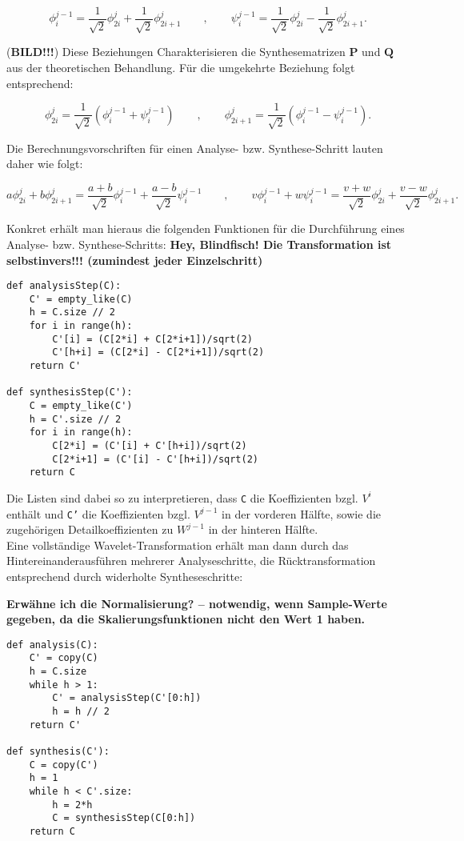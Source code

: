 \documentclass{article}
\begin{document}
\[
\phi_{i}^{j-1} = \frac{1}{\sqrt{2}} \phi_{2i}^{j} + \frac{1}{\sqrt{2}} \phi_{2i+1}^{j} 
\qquad , \qquad
\psi_{i}^{j-1} = \frac{1}{\sqrt{2}} \phi_{2i}^{j} - \frac{1}{\sqrt{2}} \phi_{2i+1}^{j}
.
\]

\noindent (\textbf{BILD!!!}) Diese Beziehungen Charakterisieren die Synthesematrizen $\mathbf{P}$ und $\mathbf{Q}$ aus der theoretischen Behandlung. Für die umgekehrte Beziehung folgt entsprechend:

\[
\phi_{2i}^{j} = \frac{1}{\sqrt{2}} (\phi_{i}^{j-1} + \psi_{i}^{j-1})
\qquad , \qquad
\phi_{2i+1}^{j} = \frac{1}{\sqrt{2}} (\phi_{i}^{j-1} - \psi_{i}^{j-1})
.
\]

\noindent Die Berechnungsvorschriften für einen Analyse- bzw. Synthese-Schritt lauten daher wie folgt:

\[
a \phi_{2i}^{j} + b \phi_{2i+1}^{j} = \frac{a + b}{\sqrt{2}} \phi_{i}^{j-1} + \frac{a - b}{\sqrt{2}} \psi_{i}^{j-1}
\qquad , \qquad
v \phi_{i}^{j-1} + w \psi_{i}^{j-1} = \frac{v + w}{\sqrt{2}} \phi_{2i}^{j} + \frac{v - w}{\sqrt{2}} \phi_{2i+1}^{j}
.
\]

\noindent Konkret erhält man hieraus die folgenden Funktionen für die Durchführung eines Analyse- bzw. Synthese-Schritts: \textbf{Hey, Blindfisch! Die Transformation ist selbstinvers!!! (zumindest jeder Einzelschritt)}

\begin{verbatim}
def analysisStep(C):
    C' = empty_like(C)
    h = C.size // 2
    for i in range(h):
        C'[i] = (C[2*i] + C[2*i+1])/sqrt(2)
        C'[h+i] = (C[2*i] - C[2*i+1])/sqrt(2)
    return C'

def synthesisStep(C'):
    C = empty_like(C')
    h = C'.size // 2
    for i in range(h):
        C[2*i] = (C'[i] + C'[h+i])/sqrt(2)
        C[2*i+1] = (C'[i] - C'[h+i])/sqrt(2)
    return C
\end{verbatim}

\noindent Die Listen sind dabei so zu interpretieren, dass \texttt{C} die Koeffizienten bzgl. $V^i$ enthält und \texttt{C'} die Koeffizienten bzgl. $V^{j-1}$ in der vorderen Hälfte, sowie die zugehörigen Detailkoeffizienten zu $W^{j-1}$ in der hinteren Hälfte.\\
Eine vollständige Wavelet-Transformation erhält man dann durch das Hintereinanderausführen mehrerer Analyseschritte, die Rücktransformation entsprechend durch widerholte Syntheseschritte:

\noindent \textbf{Erwähne ich die Normalisierung? -- notwendig, wenn Sample-Werte gegeben, da die Skalierungsfunktionen nicht den Wert 1 haben.}
\begin{verbatim}
def analysis(C):
    C' = copy(C)
    h = C.size
    while h > 1:
        C' = analysisStep(C'[0:h])
        h = h // 2
    return C'

def synthesis(C'):
    C = copy(C')
    h = 1
    while h < C'.size:
        h = 2*h
        C = synthesisStep(C[0:h])
    return C
\end{verbatim}
\end{document}
